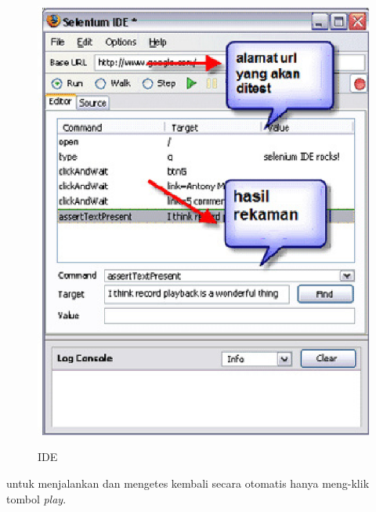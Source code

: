 \documentclass[9pt,twocolumn,twoside]{Gunadarma}
\begin{document}
\begin{figure}[htbp]
	\begin{center}
		\includegraphics[width=1\columnwidth]{IDE.eps} \label{fig:1-noFCase1}
	\end{center}
	\caption{IDE}
\end{figure}


untuk menjalankan dan mengetes kembali secara otomatis hanya meng-klik tombol \textit{play}.
\\ \\ \\ \\ \\ \\ \\ \\ \\ \\ \\ \\ \\ \\ \\ \\ \\ \\
\end{document}
